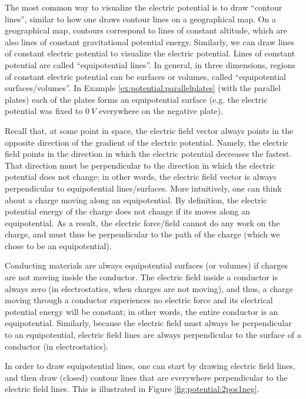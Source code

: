 The most common way to visualize the electric potential is to draw ``contour lines'', similar to how one draws contour lines on a geographical map. On a geographical map, contours correspond to lines of constant altitude, which are also lines of constant gravitational potential energy. Similarly, we can draw lines of constant electric potential to visualize the electric potential. Lines of constant potential are called ``equipotential lines''. In general, in three dimensions, regions of constant electric potential can be surfaces or volumes, called ``equipotential surfaces/volumes''. In Example \ref{ex:potential:parallelplates} (with the parallel plates) each of the plates forms an equipotential surface (e.g. the electric potential was fixed to $\SI{0}{V}$ everywhere on the negative plate). 

Recall that, at some point in space, the electric field vector always points in the opposite direction of the gradient of the electric potential. Namely, the electric field points in the direction in which the electric potential decreases the fastest. That direction must be perpendicular to the direction in which the electric potential does not change; in other words, the electric field vector is always perpendicular to equipotential lines/surfaces. More intuitively, one can think about a charge moving along an equipotential. By definition, the electric potential energy of the charge does not change if its moves along an equipotential. As a result, the electric force/field cannot do any work on the charge, and must thus be perpendicular to the path of the charge (which we chose to be an equipotential).

Conducting materials are always equipotential surfaces (or volumes) if charges are not moving inside the conductor. The electric field inside a conductor is always zero (in electrostatics, when charges are not moving), and thus, a charge moving through a conductor experiences no electric force and its electrical potential energy will be constant; in other words, the entire conductor is an equipotential. Similarly, because the electric field must always be perpendicular to an equipotential, electric field lines are always perpendicular to the surface of a conductor (in electrostatics).

In order to draw equipotential lines, one can start by drawing electric field lines, and then draw (closed) contour lines that are everywhere perpendicular to the electric field lines. This is illustrated in Figure \ref{fig:potential:2pos1neg}. 

